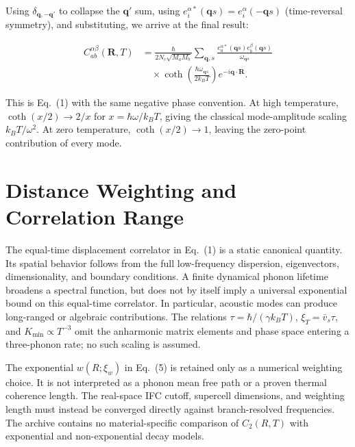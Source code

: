 \documentclass[aps,prb,reprint,amsmath,amssymb,floatfix]{revtex4-2}
\begin{document}
Using \(\delta_{\mathbf{q},-\mathbf{q}'}\) to collapse the
\(\mathbf{q}'\) sum, using
\(e_i^{\alpha*}(\mathbf{q}s) = e_i^\alpha(-\mathbf{q}s)\) (time-reversal
symmetry), and substituting, we arrive at the final result:

\color{revisionblue}
{\footnotesize
\begin{equation*}
\boxed{\begin{aligned}
C_{ab}^{\alpha\beta}(\mathbf R,T)
 &=\frac{\hbar}{2N_c\sqrt{M_aM_b}}\sum_{\mathbf q,s}
 \frac{e_a^{\alpha*}(\mathbf q s)e_b^\beta(\mathbf q s)}
 {\omega_{\mathbf q s}}\\
 &\quad\times
 \coth\!\left(\frac{\hbar\omega_{\mathbf q s}}{2k_BT}\right)
 e^{-i\mathbf q\cdot\mathbf R}.
\end{aligned}}
\end{equation*}
}
\color{black}

\color{revisionblue}
This is Eq.~(1) with the same negative phase convention. At high temperature,
\(\coth(x/2)\to2/x\) for \(x=\hbar\omega/k_BT\), giving the classical
mode-amplitude scaling \(k_BT/\omega^2\). At zero temperature,
\(\coth(x/2)\to1\), leaving the zero-point contribution of every mode.
\color{black}

\color{revisionblue}
\section{Distance Weighting and Correlation Range}
\label{appendix-b-thermal-coherence-length}
\color{black}

\color{revisionblue}
The equal-time displacement correlator in Eq.~(1) is a static canonical
quantity. Its spatial behavior follows from the full low-frequency dispersion,
eigenvectors, dimensionality, and boundary conditions. A finite dynamical
phonon lifetime broadens a spectral function, but does not by itself imply a
universal exponential bound on this equal-time correlator. In particular,
acoustic modes can produce long-ranged or algebraic contributions. The relations
\(\tau=\hbar/(\gamma k_BT)\),
\(\xi_T=\bar v_s\tau\), and
\(K_{\min}\propto T^{-3}\) omit the anharmonic matrix elements and phase
space entering a three-phonon rate; no such scaling is assumed.
\color{black}

\color{revisionblue}
The exponential \(w(R;\xi_w)\) in Eq.~(5) is retained only as a numerical
weighting choice. It is not interpreted as a phonon mean free path or a proven
thermal coherence length. The real-space IFC cutoff, supercell dimensions, and
weighting length must instead be converged directly against branch-resolved
frequencies. The archive contains no material-specific comparison of
\(C_2(R,T)\) with exponential and non-exponential decay models.
\color{black}
\end{document}
